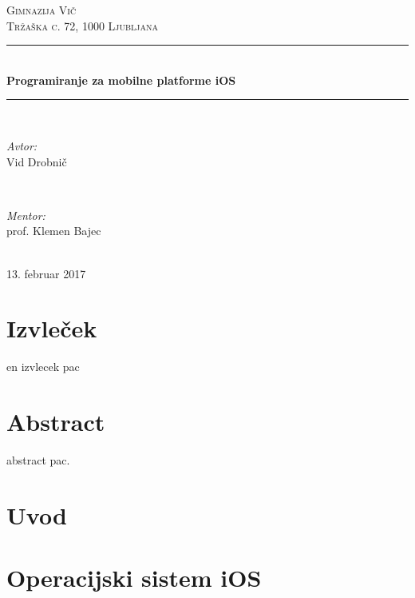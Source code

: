 \documentclass[a4paper, 12pt]{article}
\begin{document}
	\begin{titlepage}
		\newcommand{\HRule}{\rule{\linewidth}{0.5mm}}
		\center
		
		\textsc{\LARGE Gimnazija Vič}\\[0.5cm]
		\textsc{\Large Tržaška c. 72, 1000 Ljubljana}\\[1.5cm]

		\HRule \\[0.4cm]
		{ \huge \bfseries Programiranje za mobilne platforme iOS}\\[0.4cm]
		\HRule \\[1.5cm]
		
		\begin{minipage}{0.4\textwidth}
			\begin{flushleft} \large
				\emph{Avtor:}\\
				Vid Drobnič
			\end{flushleft}
		\end{minipage}
		~
		\begin{minipage}{0.4\textwidth}
			\begin{flushright} \large
				\emph{Mentor:} \\
				prof. Klemen Bajec
			\end{flushright}
		\end{minipage}\\[4cm]
		
		{\large 13. februar 2017}\\[3cm]
		\vfill
	\end{titlepage}
	
	\section*{Izvleček}
	en izvlecek pac
	
	\section*{Abstract}
	abstract pac.
	
	\pagebreak
	
	\tableofcontents
	\pagebreak
	
	\section{Uvod}
	
	
	\section{Operacijski sistem iOS}
	
	
\end{document}
